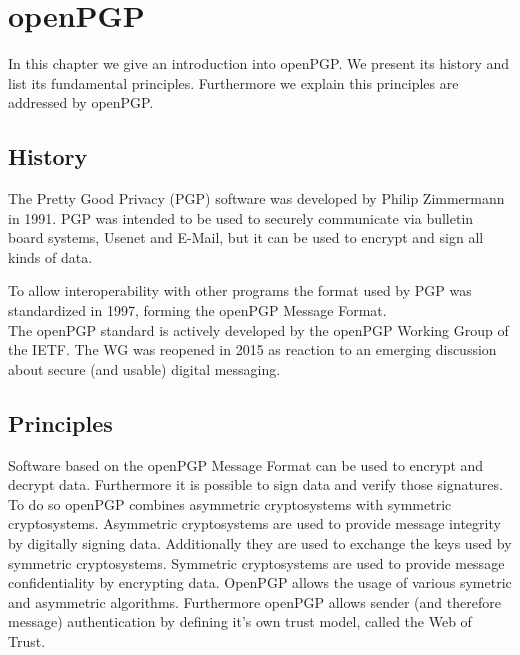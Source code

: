 \chapter{openPGP} \label{chapter:openpgp}

In this chapter we give an introduction into openPGP. 
We present its history and list its fundamental principles.
 Furthermore we explain this principles are addressed by openPGP.


\section{History}

The Pretty Good Privacy (PGP) software was developed by Philip Zimmermann in 1991.  
PGP was intended to be used to securely communicate via bulletin board systems, Usenet and E-Mail, but it can be used to encrypt and sign all kinds of data.


To allow interoperability with other programs the format used by PGP was standardized in 1997, forming the openPGP Message Format. \\


The openPGP standard is actively developed by the openPGP Working Group of the IETF. The WG was reopened in 2015 as reaction to an emerging discussion about secure (and usable) digital messaging.


\section{Principles} \label{section:openpgp:principles}

Software based on the openPGP Message Format can be used to encrypt and decrypt data. Furthermore it is possible to sign data and verify those signatures. \\


To do so openPGP combines asymmetric cryptosystems with symmetric cryptosystems. Asymmetric cryptosystems are used to provide message integrity by digitally signing data. Additionally they are used to exchange the keys used by symmetric cryptosystems. Symmetric cryptosystems are used to provide message confidentiality by encrypting data. OpenPGP allows the usage of various symetric and asymmetric algorithms. Furthermore openPGP allows sender (and therefore message) authentication by defining it's own trust model, called the Web of Trust. \\


